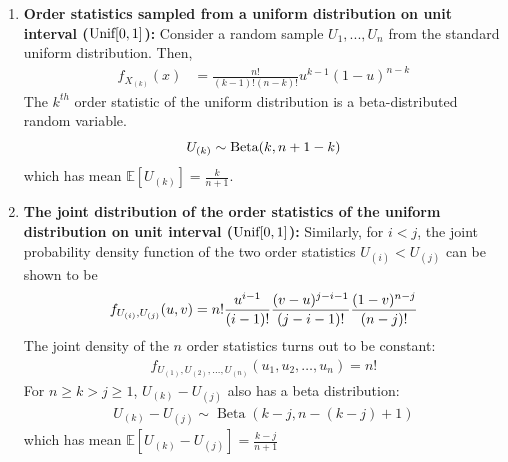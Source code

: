 \documentclass[11pt]{elegantbook}
\begin{document}
\begin{example}\quad
    \begin{enumerate}
        \item \textbf{Order statistics sampled from a uniform distribution on unit interval ($\textnormal{Unif}[0,1]$):} Consider a random sample $U_1,...,U_n$ from the standard uniform distribution. Then,
        \begin{equation}
            \begin{aligned}
                f_{X_{(k)}}(x)&={\frac {n!}{(k-1)!(n-k)!}}u^{k-1}(1-u)^{n-k}
            \end{aligned}
            \nonumber
        \end{equation}
        The $k^{th}$ order statistic of the uniform distribution is a beta-distributed random variable. $$U_{(k)}\sim \textnormal{Beta}(k,n+1-k)$$
        which has mean $\mathbb{E}[U_{(k)}]=\frac{k}{n+1}$.
        \item \textbf{The joint distribution of the order statistics of the uniform distribution on unit interval ($\textnormal{Unif}[0,1]$):}
        Similarly, for $i < j$, the joint probability density function of the two order statistics $U_{(i)} < U_{(j)}$ can be shown to be
        \begin{equation}
            \begin{aligned}
                {\displaystyle f_{U_{(i)},U_{(j)}}(u,v)=n!{u^{i-1} \over (i-1)!}{(v-u)^{j-i-1} \over (j-i-1)!}{(1-v)^{n-j} \over (n-j)!}}
            \end{aligned}
            \nonumber
        \end{equation}
        The joint density of the $n$ order statistics turns out to be constant:
        \begin{equation}
            \begin{aligned}
                {\displaystyle f_{U_{(1)},U_{(2)},\ldots ,U_{(n)}}(u_{1},u_{2},\ldots ,u_{n})=n!}
            \end{aligned}
            \nonumber
        \end{equation}
        For $n\geq k>j\geq 1$, $U_{(k)}-U_{(j)}$ also has a beta distribution:
        \begin{equation}
            \begin{aligned}
                {\displaystyle U_{(k)}-U_{(j)}\sim \operatorname {Beta} (k-j,n-(k-j)+1)}
            \end{aligned}
            \nonumber
        \end{equation}
        which has mean $\mathbb{E}[U_{(k)}-U_{(j)}]=\frac{k-j}{n+1}$
    \end{enumerate}
\end{example}
\end{document}
